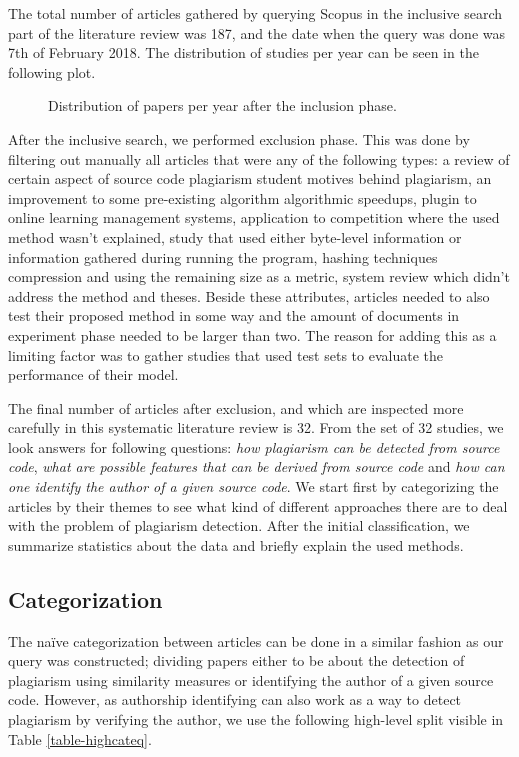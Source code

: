 The total number of articles gathered by querying Scopus in the inclusive search part of the literature review was 187, and the date when the query was done was 7th of February 2018. The distribution of studies per year can be seen in the following plot.

\begin{figure}[ht]
\centering
\setlength\figureheight{7cm}
\setlength\figurewidth{\textwidth}

\caption{Distribution of papers per year after the inclusion phase.}
\end{figure}

After the inclusive search, we performed exclusion phase. This was done by filtering out manually all articles that were any of the following types: a review of certain aspect of source code plagiarism \eg student motives behind plagiarism, an improvement to some pre-existing algorithm \eg algorithmic speedups, plugin to online learning management systems, application to competition where the used method wasn't explained, study that used either byte-level information or information gathered during running the program, hashing techniques \eg compression and using the remaining size as a metric, system review which didn't address the method and theses. Beside these attributes, articles needed to also test their proposed method in some way and the amount of documents in experiment phase needed to be larger than two. The reason for adding this as a limiting factor was to gather studies that used test sets to evaluate the performance of their model.

The final number of articles after exclusion, and which are inspected more carefully in this systematic literature review is 32. From the set of 32 studies, we look answers for following questions: \emph{how plagiarism can be detected from source code}, \emph{what are possible features that can be derived from source code} and \emph{how can one identify the author of a given source code}. We start first by categorizing the articles by their themes to see what kind of different approaches there are to deal with the problem of plagiarism detection. After the initial classification, we summarize statistics about the data and briefly explain the used methods.


\subsection{Categorization}

The naïve categorization between articles can be done in a similar fashion as our query was constructed; dividing papers either to be about the detection of plagiarism using similarity measures or identifying the author of a given source code. However, as authorship identifying can also work as a way to detect plagiarism by verifying the author, we use the following high-level split visible in Table \ref{table-highcateq}.

